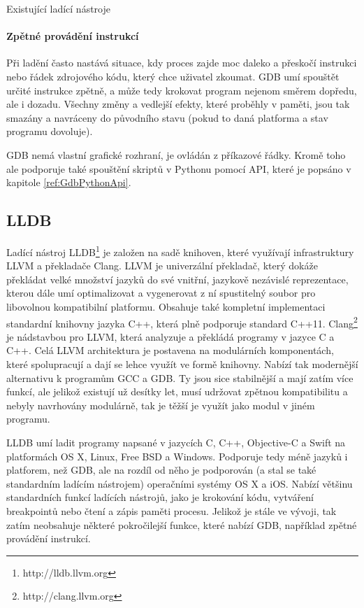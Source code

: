 \documentclass[czech,bachelor,male,python,dept460]{diploma}						%
\newcommand{\parspace}[1][]{
	\ifthenelse{\isempty{#1}}{\vspace{5mm}}{\vspace{#1}}
	\par
}
\begin{document}
\begin{section}{Existující ladící nástroje}
		\paragraph*{Zpětné provádění instrukcí}
			Při ladění často nastává situace, kdy proces zajde moc daleko a přeskočí instrukci nebo řádek zdrojového kódu, který chce uživatel zkoumat.
			GDB umí spouštět určité instrukce zpětně, a může tedy krokovat program nejenom směrem dopředu, ale i dozadu.
			Všechny změny a vedlejší efekty, které proběhly v paměti, jsou tak smazány a navráceny do původního stavu (pokud to daná platforma a stav programu dovoluje).
		
		\parspace GDB nemá vlastní grafické rozhraní, je ovládán z příkazové řádky. Kromě toho ale podporuje také spouštění skriptů v Pythonu pomocí API,
		které je popsáno v kapitole \ref{ref:GdbPythonApi}.
	\subsection{LLDB}
		Ladící nástroj LLDB\footnote{http://lldb.llvm.org} je založen na sadě knihoven, které využívají infrastruktury LLVM a překladače Clang.
		LLVM je univerzální překladač, který dokáže překládat velké množství jazyků do své vnitřní, jazykově nezávislé reprezentace, kterou dále umí
		optimalizovat a vygenerovat z ní spustitelný soubor pro libovolnou kompatibilní platformu. Obsahuje také kompletní implementaci standardní
		knihovny jazyka C++, která plně podporuje standard C++11. Clang\footnote{http://clang.llvm.org} je nádstavbou pro LLVM, která analyzuje a
		překládá programy v jazyce C a C++. Celá LLVM architektura je postavena na modulárních komponentách, které spolupracují a dají se lehce využít ve
		formě knihovny. Nabízí tak modernější alternativu k programům GCC a GDB. Ty jsou sice stabilnější a mají zatím více funkcí, ale jelikož existují už
		desítky let, musí udržovat zpětnou kompatibilitu a nebyly navrhovány modulárně, tak je těžší je využít jako modul v jiném programu.
		
		\parspace LLDB umí ladit programy napsané v jazycích C, C++, Objective-C a Swift na platformách OS X, Linux, Free BSD a Windows. Podporuje tedy méně jazyků
		i platforem, než GDB, ale na rozdíl od něho je podporován (a stal se také standardním ladícím nástrojem) operačními systémy OS X a iOS.
		Nabízí většinu standardních funkcí ladících nástrojů, jako je krokování kódu, vytváření breakpointů nebo čtení a zápis paměti procesu.
		Jelikož je stále ve vývoji, tak zatím neobsahuje některé pokročilejší funkce, které nabízí GDB, například zpětné provádění instrukcí.


\end{section}
\end{document}
